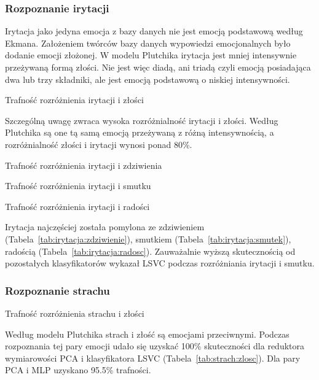 \documentclass[a4paper,12pt,twoside,openany]{report}
\newcommand{\Tab}[1]{(Tabela~\ref{#1})}
\begin{document}
\subsubsection{Rozpoznanie irytacji}
Irytacja jako jedyna emocja z bazy danych nie jest emocją podstawową według Ekmana.
Założeniem twórców bazy danych wypowiedzi emocjonalnych było dodanie emocji złożonej.
W modelu Plutchika irytacja jest mniej intensywnie przeżywaną formą złości.
Nie jest więc diadą, ani triadą czyli emocją posiadająca dwa lub trzy składniki,
ale jest emocją podstawową o niskiej intensywności.
\begin{table}[hc!]
	\caption{Trafność rozróżnienia irytacji i złości}
	\centering
	
	\label{tab:irytacja:zlosc}
\end{table}
Szczególną uwagę zwraca wysoka rozróżnialność irytacji i złości.
Według Plutchika są one tą samą emocją przeżywaną z różną intensywnością,
a rozróżnialność złości i irytacji wynosi ponad 80\%.

\begin{table}[hc!]
	\caption{Trafność rozróżnienia irytacji i zdziwienia}
	\centering
	
	\label{tab:irytacja:zdziwienie}
\end{table}
\begin{table}[hc!]
	\caption{Trafność rozróżnienia irytacji i smutku}
	\centering
	
	\label{tab:irytacja:smutek}
\end{table}
\begin{table}[hc!]
	\caption{Trafność rozróżnienia irytacji i radości}
	\centering
	
	\label{tab:irytacja:radosc}
\end{table}
Irytacja najczęściej została pomylona ze zdziwieniem \Tab{tab:irytacja:zdziwienie}, smutkiem \Tab{tab:irytacja:smutek}, radością \Tab{tab:irytacja:radosc}.
Zauważalnie wyższą skutecznością od pozostałych klasyfikatorów wykazał LSVC podczas rozróżniania irytacji i smutku.
\subsubsection{Rozpoznanie strachu}
\begin{table}[hc!]
	\caption{Trafność rozróżnienia strachu i złości}
	\centering
	
	\label{tab:strach:zlosc}
\end{table}
Według modelu Plutchika strach i złość są emocjami przeciwnymi. 
Podczas rozpoznania tej pary emocji udało się uzyskać 100\% skuteczności dla reduktora wymiarowości PCA i klasyfikatora LSVC \Tab{tab:strach:zlosc}.
Dla pary PCA i MLP uzyskano 95.5\% trafności.
\end{document}
